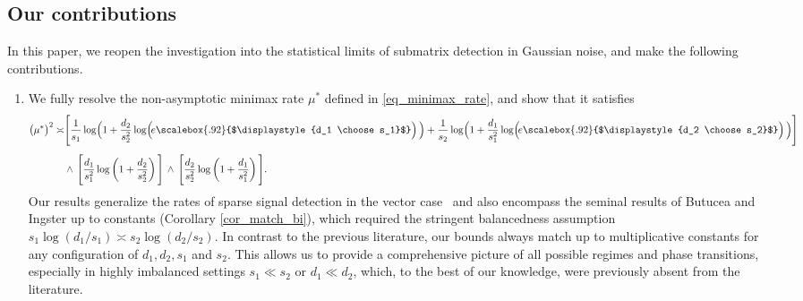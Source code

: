\documentclass{article}
\theoremstyle{remark}
\begin{document}
\subsection{Our contributions}
In this paper, we reopen the investigation into the statistical limits of submatrix detection in Gaussian noise, and make the following contributions.
 \begin{enumerate}
     \item We fully resolve the non-asymptotic  minimax rate $\mu^*$ defined in \eqref{eq_minimax_rate}, and show that it satisfies
     \begin{align*}
    \big(\mu^*\big)^2 \asymp &\Bigg[\frac{1}{s_1} \log\!\Big(1+ \frac{d_2}{s_2^2} \log\!\Big(\!e\scalebox{.92}{$\displaystyle{d_1 \choose s_1}$}\Big)\,\Big) + \frac{1}{s_2} \log\!\Big(1+ \frac{d_1}{s_1^2} \log\!\Big(\!e\scalebox{.92}{$\displaystyle{d_2 \choose s_2}$}\Big)\,\Big)\Bigg] \\[5pt]
    &\land \, \Bigg[\frac{d_1}{s_1^2} \log\left(1+\frac{d_2}{s_2^2}\right)\Bigg] \, \land \, \Bigg[\frac{d_2}{s_2^2} \log\left(1+\frac{d_1}{s_1^2}\right)\Bigg].
\end{align*}
    Our results generalize the rates of sparse signal detection in the vector case~\citep{collier2017minimax} and also encompass the seminal results of Butucea and Ingster up to constants (Corollary \ref{cor_match_bi}), which required the stringent balancedness assumption $s_1\log(d_1/s_1) \asymp s_2 \log(d_2/s_2)$. 
     In contrast to the previous literature, our bounds always match up to multiplicative constants for any configuration of $d_1,d_2,s_1$ and $s_2$. 
     This allows us to provide a comprehensive picture of all possible regimes and phase transitions, especially in highly imbalanced settings $s_1 \ll s_2$ or $d_1 \ll d_2$, which, to the best of our knowledge, were previously absent from the literature. %


\end{enumerate}
\end{document}
